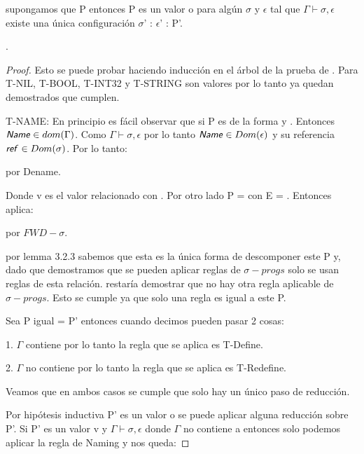 \begin{theorem}[Progreso]
    supongamos que P 
    entonces P es un valor o para algún $\sigma$ y $\epsilon$ tal que
    $\Gamma \vdash \sigma, \epsilon$ existe una única configuración $\sigma$' : $\epsilon$' : P'.  

     \fullarrow {}.

\end{theorem}
\begin{proof}
Esto se puede probar haciendo inducción en el árbol de la prueba de  .
 Para T-NIL, T-BOOL, T-INT32 y T-STRING son valores por lo tanto ya quedan demostrados que cumplen.

T-NAME: En principio es fácil observar que si P es de la forma 
y . Entonces $\textsf{\textit{Name}} \in dom(\Gamma)$. Como $\Gamma 
\vdash \sigma, \epsilon$ por lo tanto  $\textsf{\textit{Name}} \in Dom(\epsilon)$ y su referencia $\textsf{\textit{ref}} \in Dom(\sigma)$. Por lo tanto:

 \sigmaprogarrow {} por Dename.

Donde v es el valor relacionado con . Por otro lado P =  con E = \hole.
 Entonces aplica:

 \fullarrow \sigmaprog{$\sigma$}{$\epsilon$}{[v]} por $FWD-\sigma$.

por lemma 3.2.3 sabemos que esta es la única forma de descomponer este P y, dado que demostramos que se pueden aplicar reglas de $\sigma-progs$ solo se usan reglas de esta relación.
restaría demostrar que no hay otra regla aplicable de $\sigma-progs$. Esto se cumple ya que solo una regla es igual a este P.

Sea P igual  = P' entonces cuando decimos 
 pueden pasar 2 cosas:

    1. $\Gamma$ contiene  por lo tanto la regla que se aplica es
    T-Define.

    2. $\Gamma$ no contiene  por lo tanto la regla que se aplica
    es T-Redefine.

Veamos que en ambos casos se cumple que solo hay un único paso de reducción.

Por hipótesis inductiva P' es un valor o se puede aplicar alguna 
reducción sobre P'. Si P' es un valor v y $\Gamma \vdash \sigma, \epsilon$
 donde $\Gamma$ no contiene a  entonces solo podemos aplicar 
 la regla de Naming y nos queda:


\end{proof}
